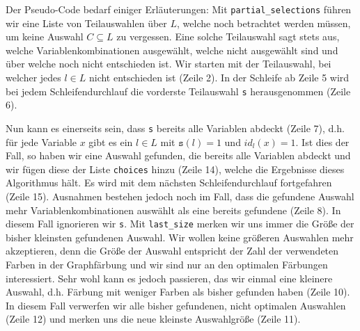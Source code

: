\documentclass[a4paper]{article}
\theoremstyle{nonumberplain}
\begin{document}
Der Pseudo-Code bedarf einiger Erläuterungen: Mit \texttt{partial\_selections} führen wir eine Liste von Teilauswahlen über $L$, welche noch betrachtet werden müssen, um keine Auswahl $C \subseteq L$ zu vergessen. Eine solche Teilauswahl sagt stets aus, welche Variablenkombinationen ausgewählt, welche nicht ausgewählt sind und über welche noch nicht entschieden ist. Wir starten mit der Teilauswahl, bei welcher jedes $l \in L$ nicht entschieden ist (Zeile 2). In der Schleife ab Zeile 5 wird bei jedem Schleifendurchlauf die vorderste Teilauswahl \texttt{s} herausgenommen (Zeile 6).

Nun kann es einerseits sein, dass \texttt{s} bereits alle Variablen abdeckt (Zeile 7), d.h. für jede Variable $x$ gibt es ein $l \in L$ mit $\mathtt{s}(l) = 1$ und $id_l(x) = 1$. Ist dies der Fall, so haben wir eine Auswahl gefunden, die bereits alle Variablen abdeckt und wir fügen diese der Liste \texttt{choices} hinzu (Zeile 14), welche die Ergebnisse dieses Algorithmus hält. Es wird mit dem nächsten Schleifendurchlauf fortgefahren (Zeile 15). Ausnahmen bestehen jedoch noch im Fall, dass die gefundene Auswahl mehr Variablenkombinationen auswählt als eine bereits gefundene (Zeile 8). In diesem Fall ignorieren wir \texttt{s}. Mit \texttt{last\_size} merken wir uns immer die Größe der bisher kleinsten gefundenen Auswahl. Wir wollen keine größeren Auswahlen mehr akzeptieren, denn die Größe der Auswahl entspricht der Zahl der verwendeten Farben in der Graphfärbung und wir sind nur an den optimalen Färbungen interessiert. Sehr wohl kann es jedoch passieren, das wir einmal eine kleinere Auswahl, d.h. Färbung mit weniger Farben als bisher gefunden haben (Zeile 10). In diesem Fall verwerfen wir alle bisher gefundenen, nicht optimalen Auswahlen (Zeile 12) und merken uns die neue kleinste Auswahlgröße (Zeile 11).
\end{document}
